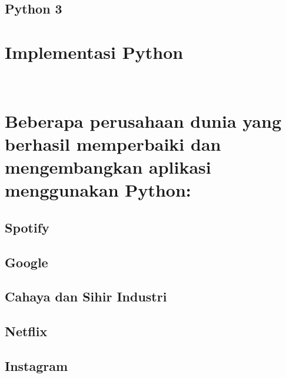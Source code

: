 \documentclass{article}
\begin{document}
\subsection{	Python 3}
\usepackage{Dirilis pada akhir tahun 2008, dengan focus untuk melakukan perapian pada codebase  dan menghapuskan duplikasi (redundancy). Awalnya, Python 3 mengalami hambatan pada pengadopsiannya. Itu akibat dari tidak adanya backwards compatibility dengan Python 2. Tambahannya banyak sekali library yang hanya tersedia untuk Python 2.}

\section{Implementasi Python}
\usepackage{CPython adalah implementasi Python asli. CPython  kebetulan diimplementasikan di C. CPython mengkompilasi kode python menjadi bytecode (transparan) dan menafsirkan bytecode dalam lingkaran evaluasi.}\\

\usepackage{Jython, IronPython, dan PyPy adalah implementasi lainnya dari Bahasa pemrograman Python. Jython diimplementasikan di Java, C# dan RPython (subset dari Python), di implementasikan pada lingkungan masing-masing. Jython mengkompilasi kode Python ke Java bytecode, jadi kode Python dapat berjalan di JVM. IronPython memungkinkan kita menjalankan Python di Microsoft CLR. Dan PyPy yang diimplementasikan di (subset dari) Python memungkinkan kita menjalankan kode Python lebih cepat dari CPython menggunakan JIT Compiler. Ada sebuah proyek yang menerjemahkan kode Python ke C dan itu disebut Cython.}

\section{Beberapa perusahaan dunia yang berhasil memperbaiki dan mengembangkan aplikasi menggunakan Python:}
\subsection{	Spotify}
\usepackage{Penyedia layanan streaming music Spotify memanfaatkan Python untuk analisis data dan backend.}
\subsection{	Google}
\usepackage{Dari awal berdiri, Google sudah menggunakan Python, bahkan Python merupakan salah satu Bahasa pemrograman yang penting bagi Google.}
\subsection{	Cahaya dan Sihir Industri}
\usepackage{Menggunakan Python, ILM dapat dengan mudah membungkus perangkat lunak dan meningkatkan aplikasi grafis mereka.}
\subsection{	Netflix}
\usepackage{Salah satu penggunaan utama Python di aplikasi Netflix adalah pada Central Alert Gateway.}
\subsection{	Instagram}
\usepackage{Bagi para pengembang aplikasi di Instagram Python sangat ramah pengguna, mudah dan rapi.}
\end{document}
